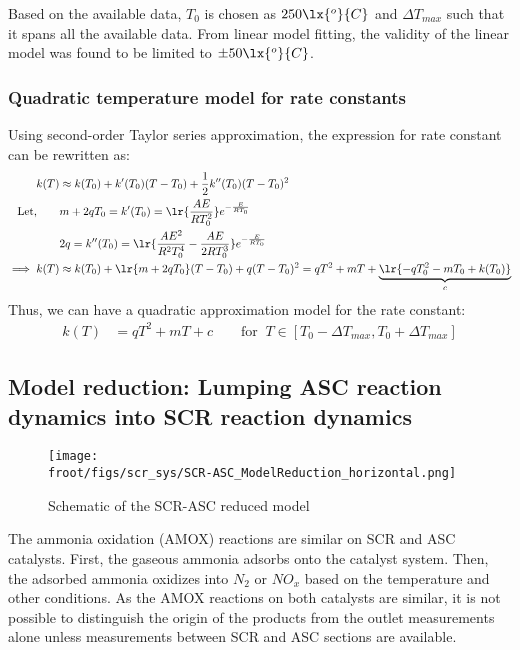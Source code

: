 Based on the available data, $T_0$ is chosen as $250 \lx{^o}{C}$ and $\Delta T_{max}$ such that it spans all the
available data. From linear model fitting, the validity of the linear model was found to be limited to $\pm 50
\lx{^o}{C}$.

\subsubsection{Quadratic temperature model for rate constants}
Using second-order Taylor series approximation, the expression for rate constant can be rewritten as:
\begin{align*}
    k(T) &\approx k(T_0) + k'(T_0) (T - T_0) + \frac{1}{2} k''(T_0) (T - T_0)^2\\
    \text{Let,} \qquad
    &m + 2qT_0 = k'(T_0) = \lr{\frac{AE}{RT_0^2}} e^{-\frac{E}{RT_0}} \\
    &2 q = k''(T_0) = \lr{\frac{A E^2}{R^2 T_0^4} - \frac{A E}{2 R T_0^3}} e^{-\frac{E}{RT_0}} \\
    \implies k(T) &\approx k(T_0) + \lr{m + 2qT_0} (T - T_0) + q (T - T_0)^2
                   = q T^2 + m T + \underbrace{\lr{ -  q T_0^2 - mT_0  + k(T_0)}}_c
\end{align*}
Thus, we can have a quadratic approximation model for the rate constant:
\begin{align}
    k(T) &= q T^2 + m T + c \qquad \text{for } \: T \in [T_0 - \Delta T_{max}, T_0 + \Delta T_{max}]
\end{align}

\subsection{Model reduction: Lumping ASC reaction dynamics into SCR reaction dynamics}

\begin{figure}[H]
    \centering
    \texttt{[image: \\froot/figs/scr\_sys/SCR-ASC\_ModelReduction\_horizontal.png]}
    \caption{Schematic of the SCR-ASC reduced model}
    \label{fig:scr-asc}
\end{figure}

The ammonia oxidation (AMOX) reactions are similar on SCR and ASC catalysts. First, the gaseous ammonia adsorbs onto the
catalyst system. Then, the adsorbed ammonia oxidizes into $N_2$ or $NO_x$ based on the temperature and other conditions.
As the AMOX reactions on both catalysts are similar, it is not possible to distinguish the origin of the products
from the outlet measurements alone unless measurements between SCR and ASC sections are available.

